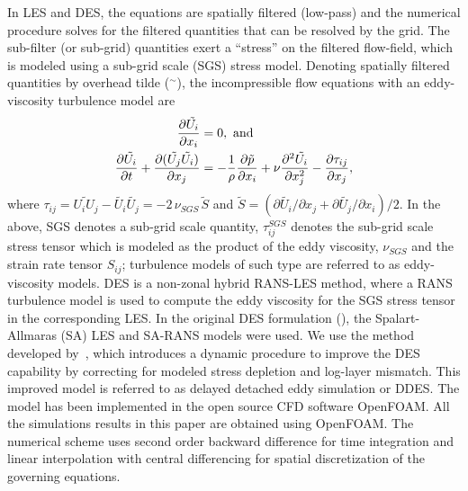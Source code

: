 In LES and DES, the equations are spatially filtered (low-pass) and the
numerical procedure solves for the filtered quantities that can be resolved by
the grid. The sub-filter (or sub-grid) quantities exert a ``stress'' on the
filtered flow-field, which is modeled using a sub-grid scale (SGS) stress
model. Denoting spatially filtered quantities by overhead tilde ($^\sim$), the
incompressible flow equations with an eddy-viscosity turbulence model are
%
\begin{align}
  \frac{\partial{\tilde{U_i}}}{\partial{x_i}}&=0,~{\rm and} \nonumber \\
   \frac{\partial{\tilde{U_i}}}{\partial{t}}+
   \frac{\partial{(\tilde{U_j}\tilde{U_i})}}{\partial{x_j}}
   &=-\frac{1}{\rho}\frac{\partial{\tilde{p}}}{\partial{x_i}}+\nu\frac{\partial{^2\tilde{U_i}}}{\partial{x_j^2}}-\frac{\partial{\tau_{ij}}}{\partial{x_j}},
 \label{eq:geqs}
\end{align}
%
where $\tau_{ij} = \widetilde{U_i U_j}-\tilde{U_i}\tilde{U_j} = -2 \, \nu_{SGS}
\, \tilde{S}$ and $\tilde{S} = (\partial{\tilde{U_i}}/\partial{x_j} +
\partial{\tilde{U_j}}/\partial{x_i})/2$. In the above, SGS denotes a sub-grid
scale quantity, $\tau_{ij}^{SGS}$ denotes the sub-grid scale stress tensor
which is modeled as the product of the eddy viscosity, $\nu_{SGS}$ and the
strain rate tensor $S_{ij}$; turbulence models of such type are referred to as
eddy-viscosity models. DES is a non-zonal hybrid RANS-LES method, where a RANS
turbulence model is used to compute the eddy viscosity for the SGS stress
tensor in the corresponding LES. In the original DES formulation
(\cite{spalart1997comments}), the Spalart-Allmaras (SA) LES and SA-RANS models
were used. We use the method developed by~\cite{yin2015dynamic}, which
introduces a dynamic procedure to improve the DES capability by correcting for
modeled stress depletion and log-layer mismatch. This improved model is
referred to as delayed detached eddy simulation or DDES. The model has been
implemented in the open source CFD software OpenFOAM. All the simulations
results in this paper are obtained using OpenFOAM. The numerical scheme uses
second order backward difference for time integration and linear interpolation
with central differencing for spatial discretization of the governing equations.

